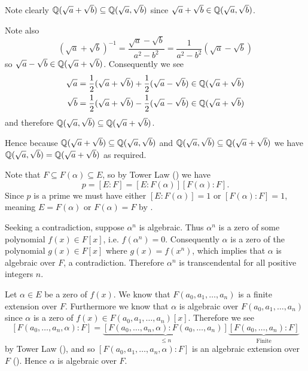 \begin{questions}
    \item Note clearly $\mathbb{Q}(\sqrt a + \sqrt b) \subseteq \mathbb{Q}(\sqrt a, \sqrt b)$ since $\sqrt a + \sqrt b \in \mathbb{Q}(\sqrt a, \sqrt b)$.

    Note also
    \[
        (\sqrt a + \sqrt b)^{-1} = \frac{\sqrt a - \sqrt b}{a^2 - b^2} = \frac1{a^2-b^2}\left(\sqrt a - \sqrt b\right)
    \]
    so $\sqrt a - \sqrt b \in \mathbb{Q}(\sqrt a + \sqrt b)$. Consequently we see
    \begin{align*}
        \sqrt a &= \frac12(\sqrt a + \sqrt b) + \frac12(\sqrt a - \sqrt b) \in \mathbb{Q}(\sqrt a + \sqrt b)\\
        \sqrt b &= \frac12(\sqrt a + \sqrt b) - \frac12(\sqrt a - \sqrt b) \in \mathbb{Q}(\sqrt a + \sqrt b)
    \end{align*}
    and therefore $\mathbb{Q}(\sqrt a, \sqrt b) \subseteq \mathbb{Q}(\sqrt a + \sqrt b)$.

    Hence because $\mathbb{Q}(\sqrt a + \sqrt b) \subseteq \mathbb{Q}(\sqrt a, \sqrt b)$ and $\mathbb{Q}(\sqrt a, \sqrt b) \subseteq \mathbb{Q}(\sqrt a + \sqrt b)$ we have $\mathbb{Q}(\sqrt a, \sqrt b) = \mathbb{Q}(\sqrt a + \sqrt b)$ as required.

    \item Note that $F \subseteq F(\alpha) \subseteq E$, so by Tower Law () we have
    \[
        p = [E:F] = [E:F(\alpha)][F(\alpha):F].
    \]
    Since $p$ is a prime we must have either $[E:F(\alpha)] = 1$ or $[F(\alpha):F] = 1$, meaning $E = F(\alpha)$ or $F(\alpha) = F$ by .

    \item Seeking a contradiction, suppose $\alpha^n$ is algebraic. Thus $\alpha^n$ is a zero of some polynomial $f(x) \in F[x]$, i.e. $f(\alpha^n) = 0$. Consequently $\alpha$ is a zero of the polynomial $g(x) \in F[x]$ where $g(x) = f(x^n)$, which implies that $\alpha$ is algebraic over $F$, a contradiction. Therefore $\alpha^n$ is transcendental for all positive integers $n$.

    \item \begin{partquestions}{\roman*}
        \item Let $\alpha \in E$ be a zero of $f(x)$. We know that $F(a_0, a_1, \dots, a_n)$ is a finite extension over $F$. Furthermore we know that $\alpha$ is algebraic over $F(a_0, a_1, \dots, a_n)$ since $\alpha$ is a zero of $f(x) \in F(a_0, a_1, \dots, a_n)[x]$. Therefore we see
        \[
            [F(a_0, \dots, a_n, \alpha):F] = \underbrace{[F(a_0, \dots, a_n, \alpha):F(a_0, \dots, a_n)]}_{\leq n}\underbrace{[F(a_0, \dots, a_n):F]}_{\text{Finite}}
        \]
        by Tower Law (), and so $[F(a_0, a_1, \dots, a_n, \alpha):F]$ is an algebraic extension over $F$ (). Hence $\alpha$ is algebraic over $F$.


\end{partquestions}
\end{questions}
